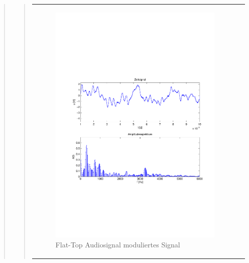\begin{quote}
\begin{quote}
\begin{center}
\begin{tabular}{ll}
                \hspace{-5cm}
                    \begin{minipage}{0.6\textwidth}
                        \begin{figure}[H]
                            \includegraphics[scale=0.55, trim = 16mm 70mm 16mm 85mm, clip]{Bilder/audioflatabget_zeit}
                              \caption{Flat-Top Audiosignal moduliertes Signal}
                              \label{fig:flataudiozeit}
                        \end{figure}
                    \end{minipage}
                    

\end{tabular}
\end{center}
\end{quote}
\end{quote}
